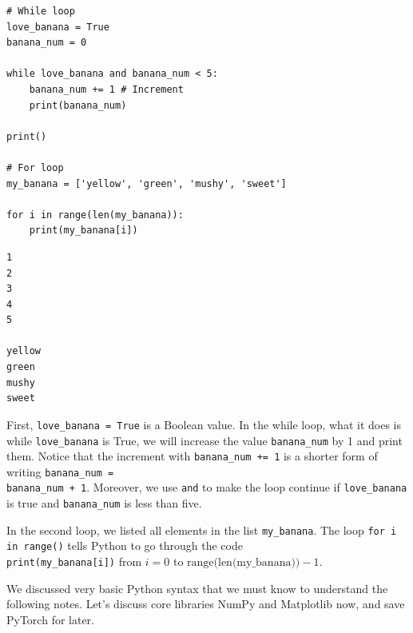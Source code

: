 \documentclass[../../../main.tex]{subfiles}
\begin{document}
\begin{jupyter}
\begin{lstlisting}[style=jin]
# While loop
love_banana = True
banana_num = 0

while love_banana and banana_num < 5:
    banana_num += 1 # Increment
    print(banana_num)

print()

# For loop
my_banana = ['yellow', 'green', 'mushy', 'sweet']

for i in range(len(my_banana)):
    print(my_banana[i])
\end{lstlisting}

\begin{lstlisting}[style=jout]
1
2
3
4
5

yellow
green
mushy
sweet
\end{lstlisting}
\end{jupyter}

First, \verb|love_banana = True| is a Boolean value.
In the while loop, what it does is while \verb|love_banana| is True,
we will increase the value \verb|banana_num| by 1 and print them.
Notice that the increment with \verb|banana_num += 1| is a shorter
form of writing \verb|banana_num =| \\ \verb|banana_num + 1|.
Moreover, we use \verb|and| to make the loop continue if
\verb|love_banana| is true and \verb|banana_num| is less than five.

In the second loop, we listed all elements in the list
\verb|my_banana|. The loop \verb|for i in range()| tells Python to
go through the code \\ \verb|print(my_banana[i])| from $i = 0$ to
$\text{range(len(my\_banana))} - 1$.

We discussed very basic Python syntax that we must know to
understand the following notes. Let's discuss core libraries
NumPy and Matplotlib now, and save PyTorch for later.
\end{document}
